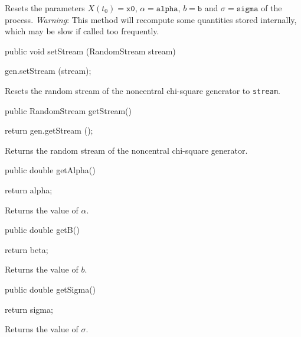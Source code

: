 \begin{tabb}
Resets the parameters $X(t_{0}) = \texttt{x0}$, $\alpha = \texttt{alpha}$,
 $b = \texttt{b}$ and $\sigma = \texttt{sigma}$ of the process.
\emph{Warning}: This method will recompute some quantities stored internally,
which may be slow if called too frequently.
\end{tabb}
\begin{code}

   public void setStream (RandomStream stream) \begin{hide} { gen.setStream (stream); }\end{hide}
\end{code}
\begin{tabb}
Resets the random stream of the noncentral chi-square generator to \texttt{stream}.
\end{tabb}
\begin{code}

   public RandomStream getStream() \begin{hide} { return gen.getStream (); }\end{hide}
\end{code}
\begin{tabb}
Returns the random stream of the noncentral chi-square generator.
\end{tabb}
\begin{code}

   public double getAlpha() \begin{hide} { return alpha; }\end{hide}
\end{code}
\begin{tabb}
Returns the value of $\alpha$.
\end{tabb}
\begin{code}

   public double getB() \begin{hide} { return beta; }\end{hide}
\end{code}
\begin{tabb}
Returns the value of $b$.
\end{tabb}
\begin{code}

   public double getSigma() \begin{hide} { return sigma; }\end{hide}
\end{code}
\begin{tabb}
Returns the value of $\sigma$.
\end{tabb}
